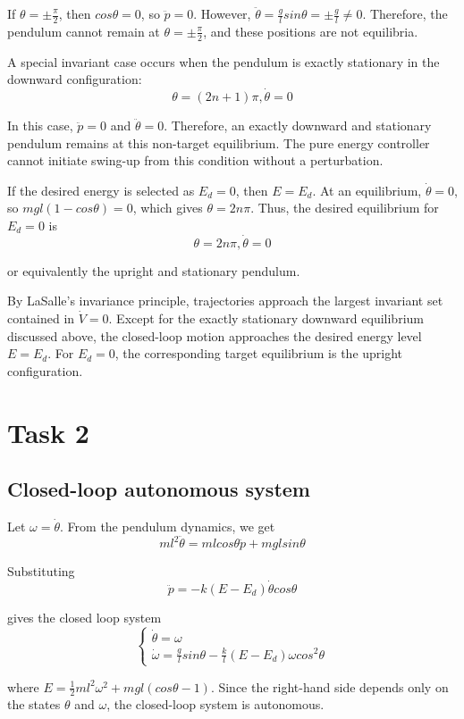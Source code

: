 \documentclass[12pt]{article}
\begin{document}
If $\theta = \pm\frac{\pi}{2}$, then $cos\theta=0$, so $\ddot{p}=0$. However, $\ddot{\theta}=\frac{g}{l}sin\theta=\pm\frac{g}{l}\ne0$. Therefore, the pendulum cannot remain at $\theta = \pm \frac{\pi}{2}$, and these positions are not equilibria.

A special invariant case occurs when the pendulum is exactly stationary in the downward configuration:
$$\theta=(2n+1)\pi, \dot{\theta}=0$$

In this case, $\ddot{p}=0$ and $\ddot{\theta}=0$. Therefore, an exactly downward and stationary pendulum remains at this non-target equilibrium. The pure energy controller cannot initiate swing-up from this condition without a perturbation.

If the desired energy is selected as $E_d=0$, then $E=E_d$. At an equilibrium, $\dot{\theta}=0$, so $mgl(1-cos\theta)=0$, which gives $\theta=2n\pi$. Thus, the desired equilibrium for $E_d=0$ is
$$\theta=2n\pi, \dot{\theta}=0$$

or equivalently the upright and stationary pendulum.

By LaSalle's invariance principle, trajectories approach the largest invariant set contained in $\dot{V}=0$. Except for the exactly stationary downward equilibrium discussed above, the closed-loop motion approaches the desired energy level $E=E_d$. For $E_d=0$, the corresponding target equilibrium is the upright configuration.

\section{Task 2}

\subsection{Closed-loop autonomous system}

Let $\omega = \dot{\theta}$. From the pendulum dynamics, we get
$$ml^2\ddot{\theta} = mlcos\theta\ddot{p} + mglsin\theta$$

Substituting
$$\ddot{p} = -k(E-E_d)\dot{\theta}cos\theta$$

gives the closed loop system
\[
\begin{cases}
\dot{\theta} = \omega\\
\dot{\omega} = \frac{g}{l}sin\theta - \frac{k}{l}(E-E_d)\omega cos^2\theta
\end{cases}
\]

where $E = \frac{1}{2}ml^2\omega^2 + mgl(cos\theta-1)$. Since the right-hand side depends only on the states $\theta$ and $\omega$, the closed-loop system is autonomous.
\end{document}
